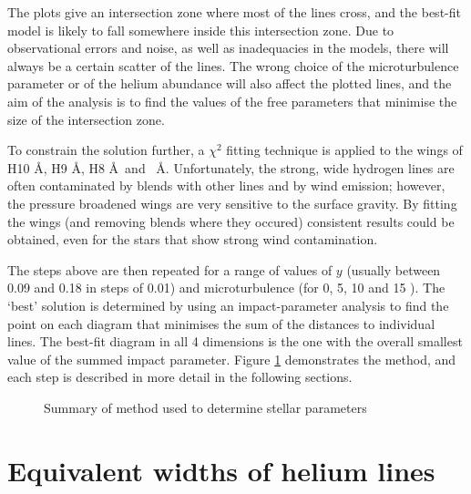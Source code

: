 The plots give an intersection zone where most of the lines cross, and the
best-fit model is likely to fall somewhere inside this intersection
zone. Due to observational errors and noise, as well as inadequacies in the
models, there will always be a certain scatter of the
lines. The wrong choice of the microturbulence parameter or of the
helium abundance will also affect the plotted lines, and the aim of the
analysis is to find the values of the free parameters that
minimise the size of the intersection zone.

To constrain the solution further, a $\chi^2$ fitting technique is
applied to the wings of H10 \AA, H9 \AA, H8 \AA\ and
\he\ \AA. Unfortunately, the strong, wide hydrogen lines are often
contaminated by blends with other lines and by wind emission; however,
the pressure broadened wings are very sensitive to the surface
gravity. By fitting the wings (and removing blends where they occured)
consistent results could be obtained, even for the stars that show
strong wind contamination.

The steps above are then repeated for a range of values of $y$
(usually between 0.09 and 0.18 in steps of 0.01) and microturbulence
(for 0, 5, 10 and 15 \kms). The `best' solution is determined by using
an impact-parameter analysis to find the point on each diagram that
minimises the sum of the distances to individual lines. The best-fit
diagram in all 4 dimensions is the one with the overall smallest value
of the summed impact parameter. Figure \ref{fig:ewsummary}
demonstrates the method, and each step is described in more detail in
the following sections.

\begin{figure} %
\begin{center}

\end{center}
\caption[Method used to determine stellar parameters]
{\fcfont Summary of method used to determine stellar parameters}
\label{fig:ewsummary}
\end{figure} %

\section{Equivalent widths of helium lines}
\label{sec:ews}

